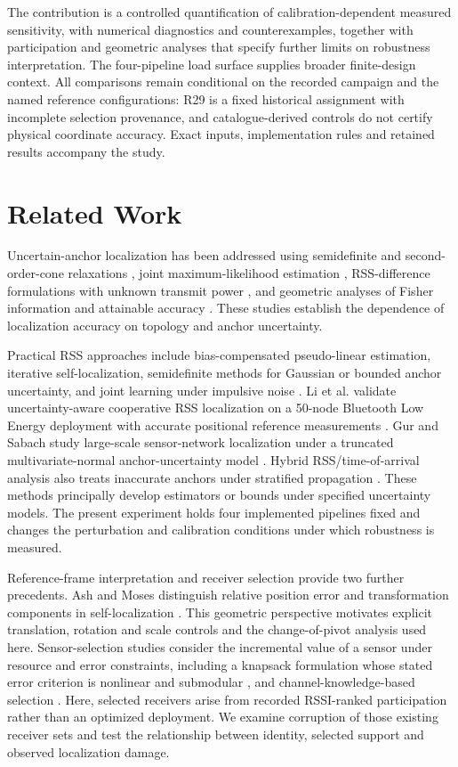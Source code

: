 \documentclass[11pt,a4paper]{article}
\begin{document}
The contribution is a controlled quantification of calibration-dependent measured sensitivity, with numerical diagnostics and counterexamples, together with participation and geometric analyses that specify further limits on robustness interpretation. The four-pipeline load surface supplies broader finite-design context. All comparisons remain conditional on the recorded campaign and the named reference configurations: R29 is a fixed historical assignment with incomplete selection provenance, and catalogue-derived controls do not certify physical coordinate accuracy. Exact inputs, implementation rules and retained results accompany the study.

\section{Related Work}\label{sec:related}
Uncertain-anchor localization has been addressed using semidefinite and second-order-cone relaxations \cite{ref1,ref2}, joint maximum-likelihood estimation \cite{ref3}, RSS-difference formulations with unknown transmit power \cite{ref4}, and geometric analyses of Fisher information and attainable accuracy \cite{ref5,ref13}. These studies establish the dependence of localization accuracy on topology and anchor uncertainty.

Practical RSS approaches include bias-compensated pseudo-linear estimation, iterative self-localization, semidefinite methods for Gaussian or bounded anchor uncertainty, and joint learning under impulsive noise \cite{ref6,ref7,ref8,ref9,ref11}. Li et al. validate uncertainty-aware cooperative RSS localization on a 50-node Bluetooth Low Energy deployment with accurate positional reference measurements \cite{ref10}. Gur and Sabach study large-scale sensor-network localization under a truncated multivariate-normal anchor-uncertainty model \cite{ref12}. Hybrid RSS/time-of-arrival analysis also treats inaccurate anchors under stratified propagation \cite{ref14}. These methods principally develop estimators or bounds under specified uncertainty models. The present experiment holds four implemented pipelines fixed and changes the perturbation and calibration conditions under which robustness is measured.

Reference-frame interpretation and receiver selection provide two further precedents. Ash and Moses distinguish relative position error and transformation components in self-localization \cite{ref16}. This geometric perspective motivates explicit translation, rotation and scale controls and the change-of-pivot analysis used here. Sensor-selection studies consider the incremental value of a sensor under resource and error constraints, including a knapsack formulation whose stated error criterion is nonlinear and submodular \cite{ref17}, and channel-knowledge-based selection \cite{ref18}. Here, selected receivers arise from recorded RSSI-ranked participation rather than an optimized deployment. We examine corruption of those existing receiver sets and test the relationship between identity, selected support and observed localization damage.
\end{document}
